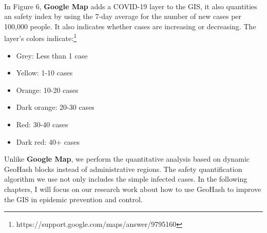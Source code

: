 \documentclass[sigplan,screen]{acmart}
\begin{document}
\\
In Figure 6, \textbf{Google Map} adds a COVID-19 layer to the GIS, it also quantities an safety index by using the 7-day average for the number of new cases per 100,000 people.
It also indicates whether cases are increasing or decreasing.
The layer's colors indicate:\footnote{https://support.google.com/maps/answer/9795160}
\begin{itemize}
	\item Grey: Less than 1 case
	\item Yellow: 1-10 cases
	\item Orange: 10-20 cases
	\item Dark orange: 20-30 cases
	\item Red: 30-40 cases
	\item Dark red: 40+ cases
\end{itemize}
Unlike \textbf{Google Map}, we perform the quantitative analysis based on dynamic GeoHash blocks instead of administrative regions.
The safety quantification algorithm we use not only includes the simple infected cases.
In the following chapters, I will focus on our research work about how to use GeoHash to improve the GIS in epidemic prevention and control.
\end{document}
